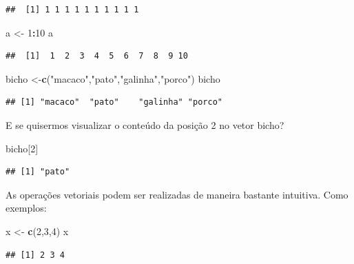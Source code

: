 \documentclass[
]{book}
\newenvironment{Shaded}{\begin{snugshade}}{\end{snugshade}}
\newcommand{\DecValTok}[1]{\textcolor[rgb]{0.00,0.00,0.81}{#1}}
\newcommand{\KeywordTok}[1]{\textcolor[rgb]{0.13,0.29,0.53}{\textbf{#1}}}
\newcommand{\NormalTok}[1]{#1}
\newcommand{\OperatorTok}[1]{\textcolor[rgb]{0.81,0.36,0.00}{\textbf{#1}}}
\newcommand{\StringTok}[1]{\textcolor[rgb]{0.31,0.60,0.02}{#1}}
\begin{document}
\begin{verbatim}
##  [1] 1 1 1 1 1 1 1 1 1 1
\end{verbatim}

\begin{Shaded}
\begin{Highlighting}[]
\NormalTok{a <-}\StringTok{ }\DecValTok{1}\OperatorTok{:}\DecValTok{10}
\NormalTok{a}
\end{Highlighting}
\end{Shaded}

\begin{verbatim}
##  [1]  1  2  3  4  5  6  7  8  9 10
\end{verbatim}

\begin{Shaded}
\begin{Highlighting}[]
\NormalTok{bicho <-}\KeywordTok{c}\NormalTok{(}\StringTok{"macaco"}\NormalTok{,}\StringTok{"pato"}\NormalTok{,}\StringTok{"galinha"}\NormalTok{,}\StringTok{"porco"}\NormalTok{)}
\NormalTok{bicho}
\end{Highlighting}
\end{Shaded}

\begin{verbatim}
## [1] "macaco"  "pato"    "galinha" "porco"
\end{verbatim}

E se quisermos visualizar o conteúdo da posição 2 no vetor bicho?

\begin{Shaded}
\begin{Highlighting}[]
\NormalTok{bicho[}\DecValTok{2}\NormalTok{]}
\end{Highlighting}
\end{Shaded}

\begin{verbatim}
## [1] "pato"
\end{verbatim}

As operações vetoriais podem ser realizadas de maneira bastante intuitiva. Como exemplos:

\begin{Shaded}
\begin{Highlighting}[]
\NormalTok{x <-}\StringTok{ }\KeywordTok{c}\NormalTok{(}\DecValTok{2}\NormalTok{,}\DecValTok{3}\NormalTok{,}\DecValTok{4}\NormalTok{)}
\NormalTok{x}
\end{Highlighting}
\end{Shaded}

\begin{verbatim}
## [1] 2 3 4
\end{verbatim}
\end{document}
